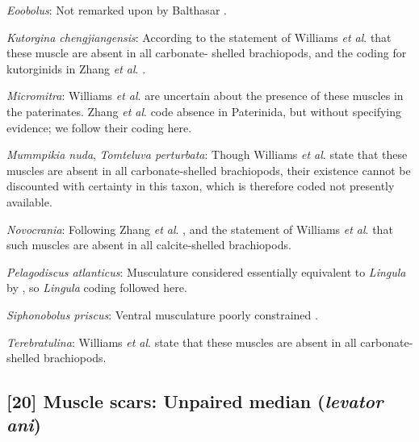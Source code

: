 \documentclass[openany]{book}
\theoremstyle{definition}
\theoremstyle{definition}
\theoremstyle{definition}
\theoremstyle{remark}
\begin{document}
\hypertarget{Eoobolus-coding-19}{}
\emph{Eoobolus}: Not remarked upon by Balthasar
\citeyearpar{Balthasar2009Thebrachiopod}.

\hypertarget{Kutorgina_chengjiangensis-coding-19}{}
\emph{Kutorgina chengjiangensis}: According to the statement of Williams
\emph{et al}. \citeyearpar[p.~32]{Williams2000LinguliformeaCraniiformea}
that these muscle are absent in all carbonate- shelled brachiopods, and
the coding for kutorginids in Zhang \emph{et al}.
\citeyearpar{Zhang2014Anearly}.

\hypertarget{Micromitra-coding-19}{}
\emph{Micromitra}: Williams \emph{et al}.
\citeyearpar[p.~32]{Williams2000LinguliformeaCraniiformea} are uncertain
about the presence of these muscles in the paterinates. Zhang \emph{et
al}. \citeyearpar{Zhang2014Anearly} code absence in Paterinida, but
without specifying evidence; we follow their coding here.

\hypertarget{Mummpikia_nuda-coding-19}{}
\emph{Mummpikia nuda}, \emph{Tomteluva perturbata}: Though Williams
\emph{et al}. \citeyearpar[p.~32]{Williams2000LinguliformeaCraniiformea}
state that these muscles are absent in all carbonate-shelled
brachiopods, their existence cannot be discounted with certainty in this
taxon, which is therefore coded not presently available.

\hypertarget{Novocrania-coding-19}{}
\emph{Novocrania}: Following Zhang \emph{et al}.
\citeyearpar{Zhang2014Anearly}, and the statement of Williams \emph{et
al}. \citeyearpar{Williams2000LinguliformeaCraniiformea} that such
muscles are absent in all calcite-shelled brachiopods.

\hypertarget{Pelagodiscus_atlanticus-coding-19}{}
\emph{Pelagodiscus atlanticus}: Musculature considered essentially
equivalent to \emph{Lingula} by
\citet{Williams2000LinguliformeaCraniiformea}, so \emph{Lingula} coding
followed here.

\hypertarget{Siphonobolus_priscus-coding-19}{}
\emph{Siphonobolus priscus}: Ventral musculature poorly constrained
\citep{Williams2000LinguliformeaCraniiformea, Popov2009Earlyontogeny}.

\hypertarget{Terebratulina-coding-19}{}
\emph{Terebratulina}: Williams \emph{et al}.
\citeyearpar[p.~32]{Williams2000LinguliformeaCraniiformea} state that
these muscles are absent in all carbonate-shelled brachiopods.

\subsection*{\texorpdfstring{{[}20{]} Muscle scars: Unpaired median
(\emph{levator
ani})}{{[}20{]} Muscle scars: Unpaired median (levator ani)}}\label{muscle-scars-unpaired-median-levator-ani}
\end{document}
